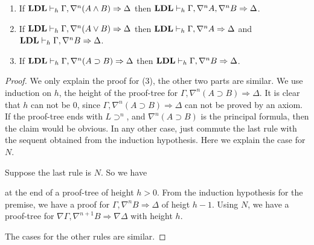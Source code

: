 
\begin{lem}[Inversion]\label{lem:inv} \quad
	\begin{enumerate}
		\item If $\LDL \vdash_h \Gamma, \nabla^n (A \wedge B) \Rightarrow \Delta$ then $\LDL \vdash_h \Gamma, \nabla^n A, \nabla^n B \Rightarrow \Delta$.
		\item If $\LDL \vdash_h \Gamma, \nabla^n (A \vee B) \Rightarrow \Delta$ then $\LDL \vdash_h \Gamma, \nabla^n A \Rightarrow \Delta$ and $\LDL \vdash_h \Gamma, \nabla^n B \Rightarrow \Delta$.
  	\item If $\LDL \vdash_h \Gamma, \nabla^n (A \supset B) \Rightarrow \Delta$ then $\LDL \vdash_h \Gamma, \nabla^n B \Rightarrow \Delta$.
	\end{enumerate}
\end{lem}
\begin{proof}
  We only explain the proof for (3), the other two parts are similar. We use induction on $h$, the height of the proof-tree for $\Gamma, \nabla^n (A \supset B) \Rightarrow \Delta$. It is clear that $h$ can not be $0$, since $\Gamma, \nabla^n (A \supset B) \Rightarrow \Delta$ can not be proved by an axiom. If the proof-tree ends with $L \supset ^n$, and $\nabla^n (A \supset B)$ is the principal formula, then the claim would be obvious. In any other case, just commute the last rule with the sequent obtained from the induction hypothesis. Here we explain the case for $N$.

  Suppose the last rule is $N$. So we have
  \begin{prooftree}
     
  \end{prooftree}
  at the end of a proof-tree of height $h > 0$. From the induction hypothesis for the premise, we have a proof for $\Gamma, \nabla^n B \Rightarrow \Delta$ of heigt $h - 1$. Using $N$, we have a proof-tree for $\nabla \Gamma, \nabla^{n+1} B \Rightarrow \nabla \Delta$ with height $h$.

  The cases for the other rules are similar.
\end{proof}